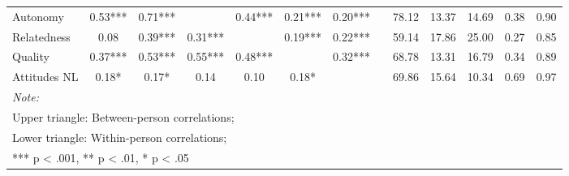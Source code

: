 \begin{table}
\begin{minipage}[t][\textheight][t]{\textwidth}
{\begin{tabular}[t]{lcccccccccccc}
\hspace{1em}Autonomy & 0.53*** & 0.71*** &  & 0.44*** & 0.21*** & 0.20*** &  & 78.12 & 13.37 & 14.69 & 0.38 & 0.90\\
\hspace{1em}Relatedness & 0.08 & 0.39*** & 0.31*** &  & 0.19*** & 0.22*** &  & 59.14 & 17.86 & 25.00 & 0.27 & 0.85\\
\hspace{1em}Quality & 0.37*** & 0.53*** & 0.55*** & 0.48*** &  & 0.32*** &  & 68.78 & 13.31 & 16.79 & 0.34 & 0.89\\
\hspace{1em}Attitudes NL & 0.18* & 0.17* & 0.14 & 0.10 & 0.18* &  &  & 69.86 & 15.64 & 10.34 & 0.69 & 0.97\\
\bottomrule
\multicolumn{13}{l}{\rule{0pt}{1em}\textit{Note: }}\\
\multicolumn{13}{l}{\rule{0pt}{1em}Upper triangle: Between-person correlations;}\\
\multicolumn{13}{l}{\rule{0pt}{1em}Lower triangle: Within-person correlations;}\\
\multicolumn{13}{l}{\rule{0pt}{1em}*** p < .001, ** p < .01,  * p < .05}\\
\end{tabular}}
\end{minipage}
\end{table}
